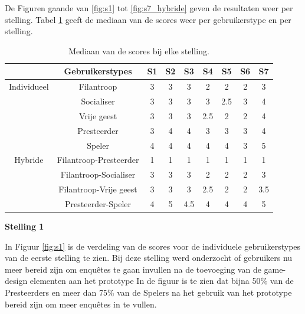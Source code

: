 De Figuren gaande van \ref{fig:s1} tot \ref{fig:s7_hybride} geven de resultaten weer per stelling. Tabel \ref{tab:mediaan} geeft de mediaan van de scores weer per gebruikerstype en per stelling.

\begin{table}
    \begin{center}
    \begin{tabular}{c|c|c|c|c|c|c|c|c}
        & Gebruikerstypes & S1 & S2 & S3  & S4  & S5  & S6 & S7  \\
        \hline
        Individueel & Filantroop             & 3  & 3  & 3   & 2   & 2   & 2  & 3   \\
        & Socialiser             & 3  & 3  & 3   & 3   & 2.5 & 3  & 4   \\
        & Vrije geest            & 3  & 3  & 3   & 2.5 & 2   & 2  & 4   \\
        & Presteerder            & 3  & 4  & 4   & 3   & 3   & 3  & 4   \\
        & Speler                 & 4  & 4  & 4   & 4   & 4   & 3  & 5   \\
        \hline
        Hybride     & Filantroop-Presteerder & 1  & 1  & 1   & 1   & 1   & 1  & 1   \\
        & Filantroop-Socialiser  & 3  & 3  & 3   & 2   & 2   & 2  & 3   \\
        & Filantroop-Vrije geest & 3  & 3  & 3   & 2.5 & 2   & 2  & 3.5 \\
        & Presteerder-Speler     & 4  & 5  & 4.5 & 4   & 4   & 4  & 5  
    \end{tabular}
    \end{center}
\caption{Mediaan van de scores bij elke stelling.}
\label{tab:mediaan}
\end{table}

\textbf{Stelling 1}

In Figuur \ref{fig:s1} is de verdeling van de scores voor de individuele gebruikerstypes van de eerste stelling te zien.  Bij deze stelling werd onderzocht of gebruikers nu meer bereid zijn om enquêtes te gaan invullen na de toevoeging van de game-design elementen aan het prototype In de figuur is te zien dat bijna 50\% van de Presteerders en meer dan 75\% van de Spelers na het gebruik van het prototype bereid zijn om meer enquêtes in te vullen.

